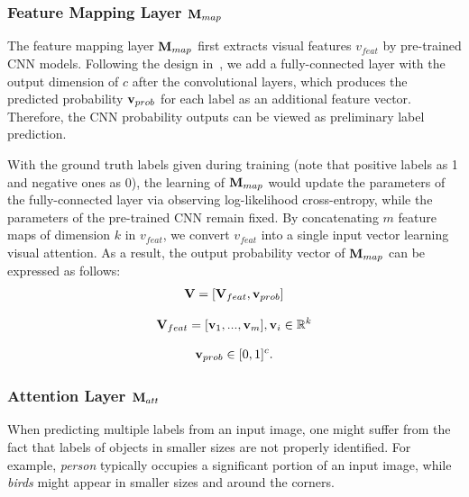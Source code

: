 \documentclass[letterpaper]{article} %
\begin{document}
\subsubsection{Feature Mapping Layer $\mathbf{M}_{map}$}

The feature mapping layer $\mathbf{M}_{map}$ first extracts visual features $v_{feat}$ by pre-trained CNN models. Following the design in~\cite{liu2016semantic}, we add a fully-connected layer with the output dimension of $c$ after the convolutional layers, which produces the predicted probability $\mathbf{v}_{prob}$ for each label as an additional feature vector. Therefore, the CNN probability outputs can be viewed as preliminary label prediction.

With the ground truth labels given during training (note that positive labels as 1 and negative ones as 0), the learning of $\mathbf{M}_{map}$ would update the parameters of the fully-connected layer via observing log-likelihood cross-entropy, while the parameters of the pre-trained CNN remain fixed. By concatenating $m$ feature maps of dimension $k$ in $v_{feat}$, we convert $v_{feat}$ into a single input vector learning visual attention. As a result, the output probability vector of $\mathbf{M}_{map}$ can be expressed as follows:
\begin{equation}
\label{eq:feats}
\begin{aligned}
\mathbf{V} = [\mathbf{V}_{feat}, \mathbf{v}_{prob}]
\end{aligned}
\end{equation}

\begin{equation}
\label{eq:V_feat}
\begin{aligned}
\mathbf{V}_{feat} = [\mathbf{v}_1, ..., \mathbf{v}_m], \mathbf{v}_i \in \mathbb{R}^k
\end{aligned}
\end{equation}

\begin{equation}
\label{eq:V_prob}
\begin{aligned} \mathbf{v}_{prob} \in [0, 1]^c.
\end{aligned}
\end{equation}

\subsubsection{Attention Layer $\mathbf{M}_{att}$}
When predicting multiple labels from an input image, one might suffer from the fact that labels of objects in smaller sizes are not properly identified. For example, \emph{person} typically occupies a significant portion of an input image, while \emph{birds} might appear in smaller sizes and around the corners.
\end{document}
